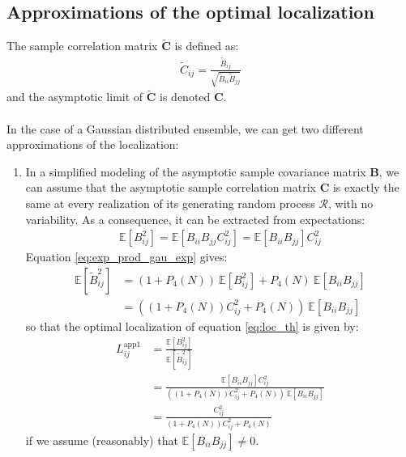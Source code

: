 \documentclass[12pt]{scrartcl}
\begin{document}
\subsection{Approximations of the optimal localization}
The sample correlation matrix $\widetilde{\mathbf{C}}$ is defined as:
\begin{align}
\widetilde{C}_{ij} = \frac{\widetilde{B}_{ij}}{\sqrt{\widetilde{B}_{ii} \widetilde{B}_{jj}}}
\end{align}
and the asymptotic limit of $\widetilde{\mathbf{C}}$ is denoted $\mathbf{C}$.\\
$  $\\
In the case of a Gaussian distributed ensemble, we can get two different approximations of the localization:
\begin{enumerate}
\item In a simplified modeling of the asymptotic sample covariance matrix $\mathbf{B}$, we can assume that the asymptotic sample correlation matrix $\mathbf{C}$ is exactly the same at every realization of its generating random process $\mathcal{R}$, with no variability. As a consequence, it can be extracted from expectations:
\begin{align}
\mathbb{E} \left[ B^2_{ij} \right] = \mathbb{E} \left[B_{ii} B_{jj} C^2_{ij} \right] = \mathbb{E} \left[B_{ii} B_{jj} \right] C^2_{ij}
\end{align}
Equation \eqref{eq:exp_prod_gau_exp} gives:
\begin{align}
\mathbb{E} \left[\widetilde{B}_{ij}^2 \right] & = \left(1 + P_4(N)\right) \ \mathbb{E} \left[B^2_{ij}\right] + P_4(N) \ \mathbb{E} \left[B_{ii} B_{jj}\right] \nonumber \\
& = \left(\left(1 + P_4(N)\right) C^2_{ij} + P_4(N) \right) \ \mathbb{E} \left[B_{ii} B_{jj} \right]
\end{align}
so that the optimal localization of equation \eqref{eq:loc_th} is given by:
\begin{align}
\label{eq:local_gau_cor_1}
L^\mathrm{app1}_{ij} & = \frac{\mathbb{E} \left[B^2_{ij}\right]}{\mathbb{E} \left[\widetilde{B}_{ij}^2\right]} \nonumber \\
& = \frac{\mathbb{E} \left[B_{ii} B_{jj} \right] C^2_{ij}}{\left(\left(1 + P_4(N)\right) C^2_{ij} + P_4(N) \right) \ \mathbb{E} \left[B_{ii} B_{jj} \right]} \nonumber \\
& = \frac{C^2_{ij}}{\left(1 + P_4(N)\right) C^2_{ij} + P_4(N)}
\end{align}
if we assume (reasonably) that $\mathbb{E} \left[B_{ii} B_{jj} \right] \ne 0$.

\end{enumerate}
\end{document}
